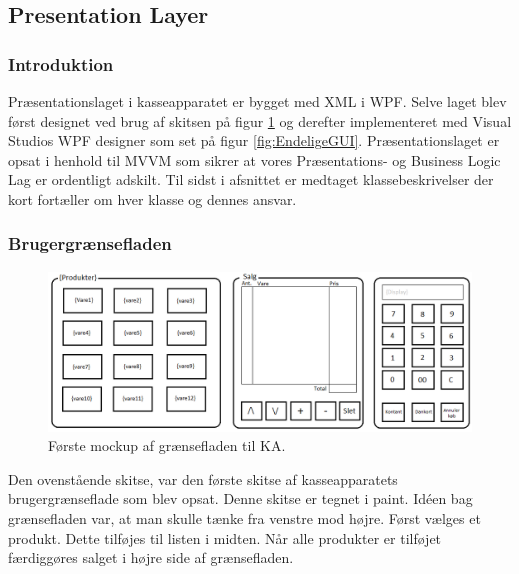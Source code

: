 
\subsection{Presentation Layer}

\subsubsection{Introduktion}
Præsentationslaget i kasseapparatet er bygget med XML i WPF. Selve laget blev først designet ved brug af skitsen på figur \ref{fig:KasseMockup} og derefter implementeret med Visual Studios WPF designer som set på figur \ref{fig:EndeligeGUI}. Præsentationslaget er opsat i henhold til MVVM som sikrer at vores Præsentations- og Business Logic Lag er ordentligt adskilt. Til sidst i afsnittet er medtaget klassebeskrivelser der kort fortæller om hver klasse og dennes ansvar. \\

\subsubsection{Brugergrænsefladen}

\begin{figure}[H]
	\centering
	\includegraphics[width=1\textwidth]{Systemdesign/Frontend/pics/KasseMockup}
	\caption{Første mockup af grænsefladen til \gls{KA}.}
	\label{fig:KasseMockup}
\end{figure}

Den ovenstående skitse, var den første skitse af kasseapparatets brugergrænseflade som blev opsat. Denne skitse er tegnet i paint. Idéen bag grænsefladen var, at man skulle tænke fra venstre mod højre. Først vælges et produkt. Dette tilføjes til listen i midten. Når alle produkter er tilføjet færdiggøres salget i højre side af grænsefladen.

